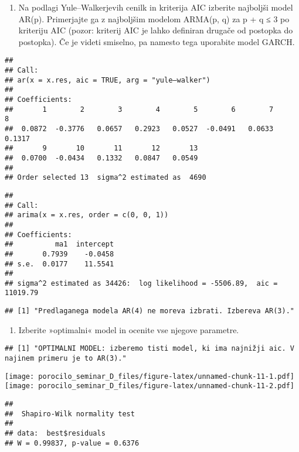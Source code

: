 \documentclass[
]{article}
\providecommand{\tightlist}{%
  \setlength{\itemsep}{0pt}\setlength{\parskip}{0pt}}
\begin{document}
\begin{enumerate}
\def\labelenumi{\arabic{enumi}.}
\setcounter{enumi}{4}
\tightlist
\item
  Na podlagi Yule--Walkerjevih cenilk in kriterija AIC izberite
  najboljši model AR(p). Primerjajte ga z najboljšim modelom ARMA(p, q)
  za p + q ≤ 3 po kriteriju AIC (pozor: kriterij AIC je lahko definiran
  drugače od postopka do postopka). Če je videti smiselno, pa namesto
  tega uporabite model GARCH.
\end{enumerate}

\begin{verbatim}
## 
## Call:
## ar(x = x.res, aic = TRUE, arg = "yule–walker")
## 
## Coefficients:
##       1        2        3        4        5        6        7        8  
##  0.0872  -0.3776   0.0657   0.2923   0.0527  -0.0491   0.0633   0.1317  
##       9       10       11       12       13  
##  0.0700  -0.0434   0.1332   0.0847   0.0549  
## 
## Order selected 13  sigma^2 estimated as  4690
\end{verbatim}

\begin{verbatim}
## 
## Call:
## arima(x = x.res, order = c(0, 0, 1))
## 
## Coefficients:
##          ma1  intercept
##       0.7939    -0.0458
## s.e.  0.0177    11.5541
## 
## sigma^2 estimated as 34426:  log likelihood = -5506.89,  aic = 11019.79
\end{verbatim}

\begin{verbatim}
## [1] "Predlaganega modela AR(4) ne moreva izbrati. Izbereva AR(3)."
\end{verbatim}

\begin{enumerate}
\def\labelenumi{\arabic{enumi}.}
\setcounter{enumi}{5}
\tightlist
\item
  Izberite »optimalni« model in ocenite vse njegove parametre.
\end{enumerate}

\begin{verbatim}
## [1] "OPTIMALNI MODEL: izberemo tisti model, ki ima najnižji aic. V najinem primeru je to AR(3)."
\end{verbatim}

\texttt{[image: porocilo\_seminar\_D\_files/figure-latex/unnamed-chunk-11-1.pdf]}
\texttt{[image: porocilo\_seminar\_D\_files/figure-latex/unnamed-chunk-11-2.pdf]}

\begin{verbatim}
## 
##  Shapiro-Wilk normality test
## 
## data:  best$residuals
## W = 0.99837, p-value = 0.6376
\end{verbatim}
\end{document}
